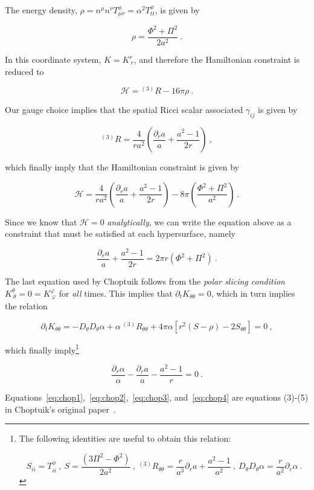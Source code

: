 \documentclass[a4paper,11pt]{article}
\renewcommand{\a}{\alpha}
\newcommand{\g}{\gamma}
\newcommand{\gDD}[2]{\g_{{#1}{#2}}}
\newcommand{\pd}{\partial}
\newcommand{\nn}{\nonumber}
\renewcommand{\H}{\mathcal{H}}
\newcommand{\lrpar}[1]{\left( #1 \right)}
\newcommand{\lrsquare}[1]{\left[ #1 \right]}
\newcommand{\n}{\noindent}
\newcommand{\eq}[1]{
  \begin{equation}
    #1
  \end{equation}
}
\begin{document}
The energy density, $\rho = n^{\mu}n^{\nu}T^{\phi}_{\mu\nu} = \alpha^{2}T^{\phi}_{tt}$, is given by

\eq{ \rho = \frac{\Phi^{2} + \Pi^{2}}{2a^{2}}\ .}

\n In this coordinate system, $K = K^{r}_{\ r}$, and therefore the Hamiltonian constraint is reduced to

\eq{ \H = {}^{(3)}\!R - 16\pi\rho\ . }

\n Our gauge choice implies that the spatial Ricci scalar associated $\gDD{i}{j}$ is given by

\eq{ ^{(3)}\!R = \frac{4}{ra^{2}}\lrpar{\frac{\pd_{r}a}{a} + \frac{a^{2}-1}{2r}}\ ,}

\n which finally imply that the Hamiltonian constraint is given by

\eq{ \H = \frac{4}{ra^{2}}\lrpar{\frac{\pd_{r}a}{a} + \frac{a^{2}-1}{2r}} - 8\pi\lrpar{\frac{\Phi^{2} + \Pi^{2}}{a^{2}}} \ .}

\n Since we know that $\H=0$ \emph{analytically}, we can write the equation above as a constraint that must be satisfied at each hypersurface, namely

\eq{ \frac{\pd_{r}a}{a} + \frac{a^{2}-1}{2r} = 2\pi r\lrpar{\Phi^{2} + \Pi^{2}}\ . \label{eq:chop3} }

The last equation used by Choptuik follows from the \emph{polar slicing condition} $K^{\theta}_{\ \theta} = 0 = K^{\varphi}_{\ \varphi}$ for \emph{all} times. This implies that $\pd_{t}K_{\theta\theta} = 0$, which in turn implies the relation

\eq{ \pd_{t}K_{\theta\theta} = -D_{\theta}D_{\theta}\a + \a\, ^{(3)}\!R_{\theta\theta} + 4\pi\a\lrsquare{r^{2}\lrpar{S-\rho} - 2S_{\theta\theta}} = 0\ ,}

\n which finally imply\footnote{The following identities are useful to obtain this relation:

  \eq{
    S_{ii} = T^{\phi}_{ii}\ ,\ S = \frac{\lrpar{3\Pi^{2} - \Phi^{2}}}{2a^{2}}\ ,\ {}^{(3)}\!R_{\theta\theta} = \frac{r}{a^{3}}\pd_{r}a + \frac{a^{2}-1}{a^{2}}\ ,\ D_{\theta}D_{\theta}\a = \frac{r}{a^{2}}\pd_{r}\a\ .\nn
  }
}

\eq{ \frac{\pd_{r}\a}{\a} - \frac{\pd_{r}a}{a} - \frac{a^{2}-1}{r} = 0\ . \label{eq:chop4}}

Equations~\eqref{eq:chop1},~\eqref{eq:chop2},~\eqref{eq:chop3}, and~\eqref{eq:chop4} are equations (3)-(5) in Choptuik's original paper~\cite{PhysRevLett.70.9}.
\end{document}
